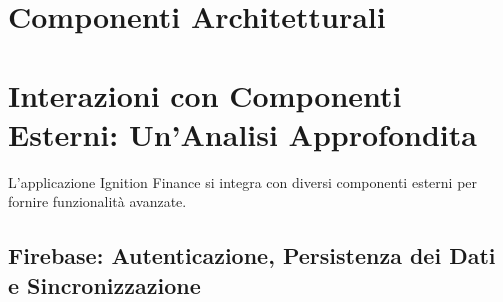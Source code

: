\documentclass{article}
\begin{document}
\section{Componenti Architetturali}\label{sec:componenti-architetturali}


\section{Interazioni con Componenti Esterni: Un'Analisi
Approfondita}\label{sec:interazioni-con-componenti-esterni:-un'analisi-approfondita}

L'applicazione Ignition Finance si integra con diversi componenti esterni per
fornire funzionalità avanzate.

\subsection{Firebase: Autenticazione, Persistenza dei Dati e
Sincronizzazione}\label{subsec:firebase:-autenticazione-persistenza-dei-dati-e-sincronizzazione}
\end{document}
